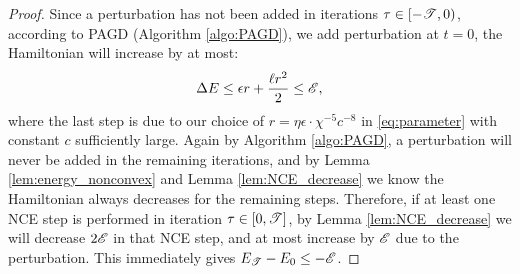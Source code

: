 \begin{proof}
Since a perturbation has not been added in iterations $\tau \in [-\mathscr{T}, 
0)$, according to PAGD (Algorithm \ref{algo:PAGD}), we add perturbation at 
$t=0$, the Hamiltonian will increase by at most:
\begin{align*}
\Delta E
\le \epsilon r + \frac{\ell r^2}{2} \le \mathscr{E},
\end{align*}
where the last step is due to our choice of $r= \eta\epsilon\cdot \chi^{-5}c^{-8}$ in \eqref{eq:parameter} with constant $c$ sufficiently large.
Again by Algorithm \ref{algo:PAGD}, a perturbation will never be added in 
the remaining iterations, and by Lemma \ref{lem:energy_nonconvex} and 
Lemma \ref{lem:NCE_decrease} we know the Hamiltonian always decreases 
for the remaining steps. Therefore, if at least one NCE step is performed 
in iteration $\tau \in [0, \mathscr{T}]$, by Lemma \ref{lem:NCE_decrease} we 
will decrease $2\mathscr{E}$ in that NCE step, and at most increase by $\mathscr{E}$ 
due to the perturbation. This immediately gives $E_{\mathscr{T}} -E_0 \le -\mathscr{E}$.


\end{proof}

